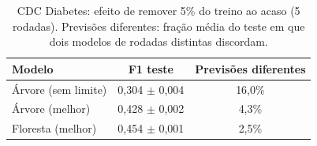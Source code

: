 \begin{table}[!t]
\centering
\caption{CDC Diabetes: efeito de remover 5\% do treino ao acaso (5 rodadas). Previsões diferentes: fração média do teste em que dois modelos de rodadas distintas discordam.}
\label{tab:cdc_estab}
\begin{tabular}{lcc}
\hline
Modelo & F1 teste & Previsões diferentes \\
\hline
Árvore (sem limite) & 0,304 $\pm$ 0,004 & 16,0\% \\
Árvore (melhor) & 0,428 $\pm$ 0,002 & 4,3\% \\
Floresta (melhor) & 0,454 $\pm$ 0,001 & 2,5\% \\
\hline
\end{tabular}
\end{table}